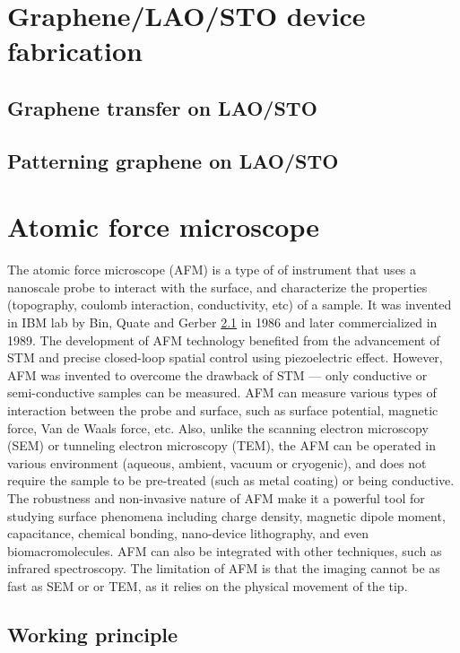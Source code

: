\documentclass[pdftex, sectionletters]{pittetd}    %
\begin{document}
\section{Graphene/LAO/STO device fabrication}

\subsection{Graphene transfer on LAO/STO}

\subsection{Patterning graphene on LAO/STO}

\section{Atomic force microscope}

The atomic force microscope (AFM) is a type of of instrument that uses a nanoscale probe to interact with the surface, and characterize the properties (topography, coulomb interaction, conductivity, etc) of a sample. It was invented in IBM lab by Bin, Quate and Gerber \ref{} in 1986 and later commercialized in 1989. The development of AFM technology benefited from the advancement of STM and precise closed-loop spatial control using piezoelectric effect. However, AFM was invented to overcome the drawback of STM --- only conductive or semi-conductive samples can be measured. AFM can measure various types of interaction between the probe and surface, such as surface potential, magnetic force, Van de Waals force, etc. Also, unlike the scanning electron microscopy (SEM) or tunneling electron microscopy (TEM), the AFM can be operated in various environment (aqueous, ambient, vacuum or cryogenic), and does not require the sample to be pre-treated (such as metal coating) or being conductive. The robustness and non-invasive nature of AFM make it a powerful tool for studying surface phenomena including charge density, magnetic dipole moment, capacitance, chemical bonding, nano-device lithography, and even biomacromolecules. AFM can also be integrated with other techniques, such as infrared spectroscopy\cite{}. The limitation of AFM is that the imaging cannot be as fast as SEM or or TEM, as it relies on the physical movement of the tip.

\subsection{Working principle}
\end{document}
